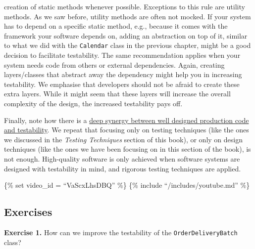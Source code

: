 \begin{itemize}
  creation of static methods whenever possible. Exceptions to this rule
  are utility methods. As we saw before, utility methods are often not
  mocked. If your system has to depend on a specific static method,
  e.g., because it comes with the framework your software depends on,
  adding an abstraction on top of it, similar to what we did with the
  \texttt{Calendar} class in the previous chapter, might be a good
  decision to facilitate testability. The same recommendation applies
  when your system needs code from others or external dependencies.
  Again, creating layers/classes that abstract away the dependency might
  help you in increasing testability. We emphasise that developers
  should not be afraid to create these extra layers. While it might seem
  that these layers will increase the overall complexity of the design,
  the increased testability pays off.
\end{itemize}

Finally, note how there is a
\href{https://www.youtube.com/watch?v=4cVZvoFGJTU}{deep synergy between
well designed production code and testability}. We repeat that focusing
only on testing techniques (like the ones we discussed in the
\emph{Testing Techniques} section of this book), or only on design
techniques (like the ones we have been focusing on in this section of
the book), is not enough. High-quality software is only achieved when
software systems are designed with testability in mind, and rigorous
testing techniques are applied.

\{\% set video\_id = ``VaScxLhsDBQ'' \%\} \{\% include
``/includes/youtube.md'' \%\}

\hypertarget{exercises}{%
\subsection{Exercises}\label{exercises}}

\textbf{Exercise 1.} How can we improve the testability of the
\texttt{OrderDeliveryBatch} class?

